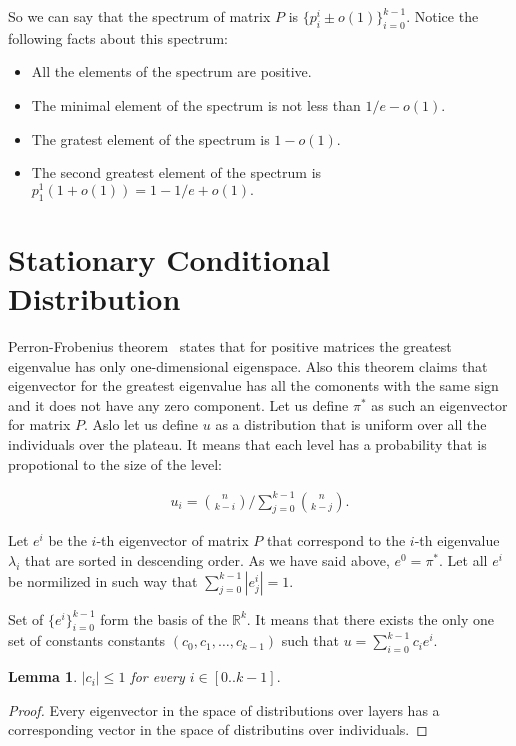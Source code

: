 \documentclass{article}
\newtheorem{lemma}{Lemma}
\begin{document}
So we can say that the spectrum of matrix $P$ is $\{p_i^i \pm o(1)\}_{i = 0}^{k - 1}.$ Notice the following facts about this spectrum:
\begin{itemize}
\item All the elements of the spectrum are positive.
\item The minimal element of the spectrum is not less than $1/e - o(1).$
\item The gratest element of the spectrum is $1 - o(1).$
\item The second greatest element of the spectrum is $p_1^1 (1 + o(1)) = 1 - 1/e + o(1).$
\end{itemize}

\section{Stationary Conditional Distribution}

Perron-Frobenius theorem~\cite{} states that for positive matrices the greatest eigenvalue has only one-dimensional eigenspace. Also this theorem claims that eigenvector for the greatest eigenvalue has all the comonents with the same sign and it does not have any zero component. Let us define $\pi^*$ as such an eigenvector for matrix $P.$ Aslo let us define $u$ as a distribution that is uniform over all the individuals over the plateau. It means that each level has a probability that is propotional to the size of the level:

\begin{align*}
  u_i = \binom{n}{k - i} / \sum\limits_{j = 0}^{k - 1} \binom{n}{k - j}.
\end{align*}

Let $e^i$ be the $i$-th eigenvector of matrix $P$ that correspond to the $i$-th eigenvalue $\lambda_i$ that are sorted in descending order. As we have said above, $e^0 = \pi^*.$ Let all $e^i$ be normilized in such way that $\sum\limits_{j = 0}^{k - 1} |e_j^i| = 1.$

Set of $\{e^i\}_{i = 0}^{k - 1}$ form the basis of the $\mathbb{R}^k.$ It means that there exists the only one set of constants constants $(c_0, c_1, \dots, c_{k - 1})$ such that $u = \sum\limits_{i = 0}^{k - 1} c_i e^i.$

\begin{lemma}
$|c_i| \le 1$ for every $i \in [0..k - 1].$
\end{lemma}

\begin{proof}
Every eigenvector in the space of distributions over layers has a corresponding vector in the space of distributins over individuals.
\end{proof}
\end{document}
